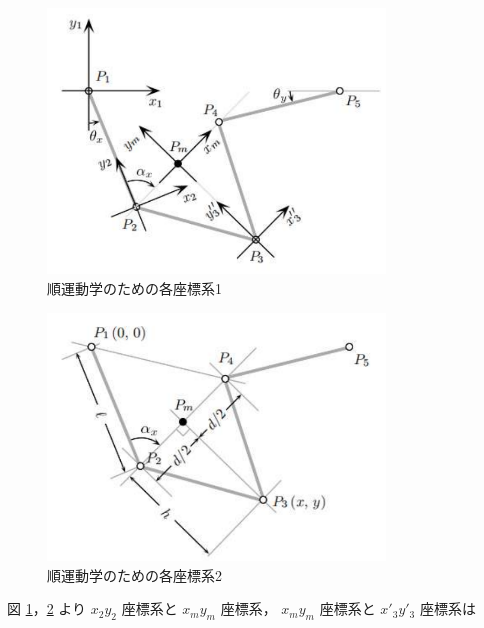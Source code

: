     \begin{figure}[H]
        \centering
        \includegraphics[width=0.8\textwidth]{figure/robot_fig5.pdf} 
        \caption{順運動学のための各座標系1}
        \label{fig:kinematics1}
    \end{figure}
    
    \begin{figure}[H]
        \centering
        \includegraphics[width=0.8\textwidth]{figure/robot_fig6.pdf}
        \caption{順運動学のための各座標系2}
        \label{fig:kinematics2}
    \end{figure}
    
図 \ref{fig:kinematics1}，\ref{fig:kinematics2} より
$x_2 y_2$ 座標系と $x_m y_m$ 座標系，
$x_m y_m$ 座標系と $x'_3 y'_3$ 座標系は

